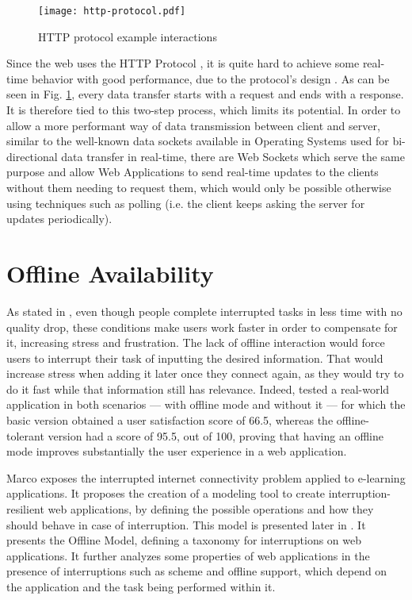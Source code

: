 \begin{figure}[t]
    \begin{center}
      \leavevmode
      \texttt{[image: http-protocol.pdf]}
      \caption{HTTP protocol example interactions}
      \label{fig:http-protocol}
    \end{center}
  \end{figure}

Since the web uses the HTTP Protocol \cite{http1-1protocol} \cite{http2protocol}, it is quite hard to achieve some real-time behavior with good performance, due to the protocol's design \cite{Spero1994}. As can be seen in Fig. \ref{fig:http-protocol}, every data transfer starts with a request and ends with a response. It is therefore tied to this two-step process, which limits its potential. In order to allow a more performant way of data transmission between client and server, similar to the well-known data sockets available in Operating Systems used for bi-directional data transfer in real-time, there are Web Sockets \cite{websocket-protocol} which serve the same purpose and allow Web Applications to send real-time updates to the clients without them needing to request them, which would only be possible otherwise using techniques such as polling (i.e. the client keeps asking the server for updates periodically). 

\section{Offline Availability}\label{sec:offline-avail-sota}

As stated in \cite{Mark2008}, even though people complete interrupted tasks in less time with no quality drop, these conditions make users work faster in order to compensate for it, increasing stress and frustration. The lack of offline interaction would force users to interrupt their task of inputting the desired information. That would increase stress when adding it later once they connect again, as they would try to do it fast while that information still has relevance. Indeed, \cite{Marco2015} tested a real-world application in both scenarios --- with offline mode and without it --- for which the basic version obtained a user satisfaction score of 66.5, whereas the offline-tolerant version had a score of 95.5, out of 100, proving that having an offline mode improves substantially the user experience in a web application. 

Marco \cite{Marco2013} exposes the interrupted internet connectivity problem applied to e-learning applications. It proposes the creation of a modeling tool to create interruption-resilient web applications, by defining the possible operations and how they should behave in case of interruption. This model is presented later in \cite{Abertos-Marco2017}. It presents the Offline Model, defining a taxonomy for interruptions on web applications. It further analyzes some properties of web applications in the presence of interruptions such as scheme and offline support, which depend on the application and the task being performed within it.

